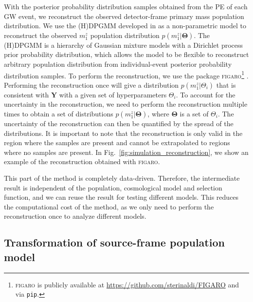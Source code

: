 \documentclass[sn-aps, pdflatex]{sn-jnl}
\begin{document}
With the posterior probability distribution samples obtained from the \ac{PE} of each \ac{GW} event, we reconstruct the observed detector-frame primary mass population distribution.
We use the \ac{(H)DPGMM} developed in \cite{Rinaldi:2021bhm} as a non-parametric model to reconstruct the observed $m^z_1$ population distribution $p(m^z_1|\mathbf{\Theta})$.
The \ac{(H)DPGMM} is a hierarchy of Gaussian mixture models with a Dirichlet process prior probability distribution, which allows the model to be flexible to reconstruct arbitrary population distribution from individual-event posterior probability distribution samples.
To perform the reconstruction, we use the package \textsc{figaro}\footnote{\textsc{figaro} is publicly available at \url{https://github.com/sterinaldi/FIGARO} and via \texttt{pip}.} \citep{Rinaldi:2024eep}.
Performing the reconstruction once will give a distribution $p(m^z_1|\Theta_i)$ that is consistent with $\mathbf{Y}$ with a given set of hyperparameters $\Theta_i$.
To account for the uncertainty in the reconstruction, we need to perform the reconstruction multiple times to obtain a set of distributions $p(m^z_1|\mathbf{\Theta})$, where $\mathbf{\Theta}$ is a set of $\Theta_i$.
The uncertainty of the reconstruction can then be quantified by the spread of the distributions.
It is important to note that the reconstruction is only valid in the region where the samples are present and cannot be extrapolated to regions where no samples are present.
In Fig.~\ref{fig:simulation_reconstruction}, we show an example of the reconstruction obtained with \textsc{figaro}.

This part of the method is completely data-driven.
Therefore, the intermediate result is independent of the population, cosmological model and selection function, and we can reuse the result for testing different models.
This reduces the computational cost of the method, as we only need to perform the reconstruction once to analyze different models.

\subsection{Transformation of source-frame population model}
\label{sec:transformation}
\end{document}
